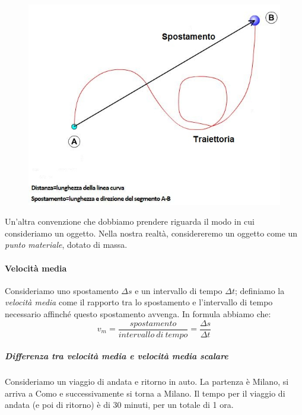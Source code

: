 \documentclass[11pt]{article}
\begin{document}
\begin{figure}[H]
\includegraphics[scale=0.5]{distanza_spostamento.jpg}
\centering
\end{figure}

Un'altra convenzione che dobbiamo prendere riguarda il modo in cui consideriamo un oggetto. Nella nostra realtà, considereremo un oggetto come un \textit{punto  materiale}, dotato di massa.

\paragraph{Velocità media} Consideriamo uno spostamento $\Delta s$ e un intervallo di tempo $\Delta t$; definiamo la \textit{velocità media} come il rapporto tra lo spostamento e l'intervallo di tempo necessario affinché questo spostamento avvenga. In formula abbiamo che:
\begin{equation}
\label{EqVelocitàMedia}
v_m = \dfrac{spostamento}{intervallo \medspace di \medspace tempo} = \dfrac{\Delta s}{\Delta t}
\end{equation}

\subparagraph{Differenza tra velocità media e velocità media scalare} Consideriamo un viaggio di andata e ritorno in auto. La partenza è Milano, si arriva a Como e successivamente si torna a Milano.  Il tempo per il viaggio di andata (e poi di ritorno) è di 30 minuti, per un totale di 1 ora.
\end{document}
